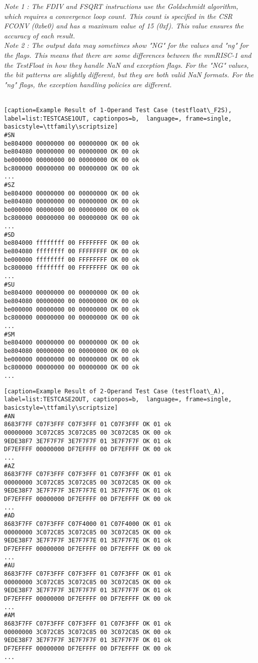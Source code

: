 \it{Note 1 : The FDIV and FSQRT instructions use the Goldschmidt algorithm, which requires a convergence loop count. This count is specified in the CSR FCONV (0xbe0) and has a maximum value of 15 (0xf). This value ensures the accuracy of each result.}\rm{}\\

\it{Note 2 : The output data may sometimes show "NG" for the values and "ng" for the flags. This means that there are some differences between the mmRISC-1 and the TestFloat in how they handle NaN and exception flags. For the "NG" values, the bit patterns are slightly different, but they are both valid NaN formats. For the "ng" flags, the exception handling policies are different.}\rm{}\\\\


\begin{lstlisting}[caption=Example Result of 1-Operand Test Case (testfloat\_F2S), label=list:TESTCASE1OUT, captionpos=b,  language=, frame=single, basicstyle=\ttfamily\scriptsize]
#SN
be804000 00000000 00 00000000 OK 00 ok
be804080 00000000 00 00000000 OK 00 ok
be000000 00000000 00 00000000 OK 00 ok
bc800000 00000000 00 00000000 OK 00 ok
...
#SZ
be804000 00000000 00 00000000 OK 00 ok
be804080 00000000 00 00000000 OK 00 ok
be000000 00000000 00 00000000 OK 00 ok
bc800000 00000000 00 00000000 OK 00 ok
...
#SD
be804000 ffffffff 00 FFFFFFFF OK 00 ok
be804080 ffffffff 00 FFFFFFFF OK 00 ok
be000000 ffffffff 00 FFFFFFFF OK 00 ok
bc800000 ffffffff 00 FFFFFFFF OK 00 ok
...
#SU
be804000 00000000 00 00000000 OK 00 ok
be804080 00000000 00 00000000 OK 00 ok
be000000 00000000 00 00000000 OK 00 ok
bc800000 00000000 00 00000000 OK 00 ok
...
#SM
be804000 00000000 00 00000000 OK 00 ok
be804080 00000000 00 00000000 OK 00 ok
be000000 00000000 00 00000000 OK 00 ok
bc800000 00000000 00 00000000 OK 00 ok
...
\end{lstlisting}

\begin{lstlisting}[caption=Example Result of 2-Operand Test Case (testfloat\_A), label=list:TESTCASE2OUT, captionpos=b,  language=, frame=single, basicstyle=\ttfamily\scriptsize]
#AN
8683F7FF C07F3FFF C07F3FFF 01 C07F3FFF OK 01 ok
00000000 3C072C85 3C072C85 00 3C072C85 OK 00 ok
9EDE38F7 3E7F7F7F 3E7F7F7F 01 3E7F7F7F OK 01 ok
DF7EFFFF 00000000 DF7EFFFF 00 DF7EFFFF OK 00 ok
...
#AZ
8683F7FF C07F3FFF C07F3FFF 01 C07F3FFF OK 01 ok
00000000 3C072C85 3C072C85 00 3C072C85 OK 00 ok
9EDE38F7 3E7F7F7F 3E7F7F7E 01 3E7F7F7E OK 01 ok
DF7EFFFF 00000000 DF7EFFFF 00 DF7EFFFF OK 00 ok
...
#AD
8683F7FF C07F3FFF C07F4000 01 C07F4000 OK 01 ok
00000000 3C072C85 3C072C85 00 3C072C85 OK 00 ok
9EDE38F7 3E7F7F7F 3E7F7F7E 01 3E7F7F7E OK 01 ok
DF7EFFFF 00000000 DF7EFFFF 00 DF7EFFFF OK 00 ok
...
#AU
8683F7FF C07F3FFF C07F3FFF 01 C07F3FFF OK 01 ok
00000000 3C072C85 3C072C85 00 3C072C85 OK 00 ok
9EDE38F7 3E7F7F7F 3E7F7F7F 01 3E7F7F7F OK 01 ok
DF7EFFFF 00000000 DF7EFFFF 00 DF7EFFFF OK 00 ok
...
#AM
8683F7FF C07F3FFF C07F3FFF 01 C07F3FFF OK 01 ok
00000000 3C072C85 3C072C85 00 3C072C85 OK 00 ok
9EDE38F7 3E7F7F7F 3E7F7F7F 01 3E7F7F7F OK 01 ok
DF7EFFFF 00000000 DF7EFFFF 00 DF7EFFFF OK 00 ok
...
\end{lstlisting}

